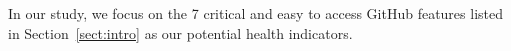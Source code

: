 \documentclass[smallextended]{svjour3}
\newcommand{\BLUE}{\color{blue}}
\begin{document}



In our study, we focus on the 7 critical and easy to access GitHub features listed in Section~\ref{sect:intro} as our potential health indicators. 
\end{document}
